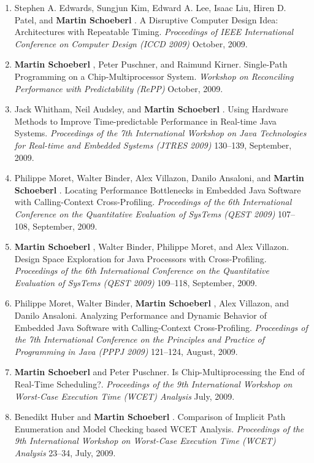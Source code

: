 \begin{enumerate}
\item Stephen A. Edwards, Sungjun Kim, Edward A. Lee, Isaac Liu, Hiren D. Patel, and {\bf Martin Schoeberl }.
 A Disruptive Computer Design Idea: Architectures with Repeatable Timing.
 \emph{Proceedings of IEEE International Conference on Computer Design (ICCD 2009)} October, 2009.

\item {\bf Martin Schoeberl }, Peter Puschner, and Raimund Kirner.
 Single-Path Programming on a Chip-Multiprocessor System.
 \emph{Workshop on Reconciling Performance with Predictability (RePP)} October, 2009.

\item Jack Whitham, Neil Audsley, and {\bf Martin Schoeberl }.
 Using Hardware Methods to Improve Time-predictable Performance in Real-time Java Systems.
 \emph{Proceedings of the 7th International Workshop on Java Technologies for Real-time and Embedded Systems (JTRES 2009)} 130--139, September, 2009.

\item Philippe Moret, Walter Binder, Alex Villazon, Danilo Ansaloni, and {\bf Martin Schoeberl }.
 Locating Performance Bottlenecks in Embedded Java Software with Calling-Context Cross-Profiling.
 \emph{Proceedings of the 6th International Conference on the Quantitative Evaluation of SysTems (QEST 2009)} 107--108, September, 2009.

\item {\bf Martin Schoeberl }, Walter Binder, Philippe Moret, and Alex Villazon.
 Design Space Exploration for Java Processors with Cross-Profiling.
 \emph{Proceedings of the 6th International Conference on the Quantitative Evaluation of SysTems (QEST 2009)} 109--118, September, 2009.

\item Philippe Moret, Walter Binder, {\bf Martin Schoeberl }, Alex Villazon, and Danilo Ansaloni.
 Analyzing Performance and Dynamic Behavior of Embedded Java Software with Calling-Context Cross-Profiling.
 \emph{Proceedings of the 7th International Conference on the Principles and Practice of Programming in Java (PPPJ 2009)} 121--124, August, 2009.

\item {\bf Martin Schoeberl } and Peter Puschner.
 Is Chip-Multiprocessing the End of Real-Time Scheduling?.
 \emph{Proceedings of the 9th International Workshop on Worst-Case Execution Time (WCET) Analysis} July, 2009.

\item Benedikt Huber and {\bf Martin Schoeberl }.
 Comparison of Implicit Path Enumeration and Model Checking based WCET Analysis.
 \emph{Proceedings of the 9th International Workshop on Worst-Case Execution Time (WCET) Analysis} 23--34, July, 2009.


\end{enumerate}
